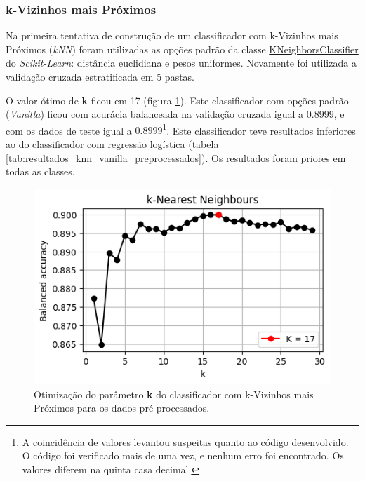 \documentclass[final,5p]{elsarticle}
\numberwithin{equation}{section}
\begin{document}
    \subsubsection{k-Vizinhos mais Próximos}

        Na primeira tentativa de construção de um classificador com k-Vizinhos mais Próximos (\emph{kNN}) foram utilizadas as opções padrão da classe \href{https://scikit-learn.org/stable/modules/generated/sklearn.neighbors.KNeighborsClassifier.html}{KNeighborsClassifier} do \emph{Scikit-Learn}: distância euclidiana e pesos uniformes. Novamente foi utilizada a validação cruzada estratificada em 5 pastas.

        O valor ótimo de \textbf{k} ficou em 17 (figura \ref{fig:knn_melhor_k_preprocessados}). Este classificador com opções padrão (\emph{Vanilla}) ficou com acurácia balanceada na validação cruzada igual a $0.8999$, e com os dados de teste igual a $0.8999$\footnote{A coincidência de valores levantou suspeitas quanto ao código desenvolvido. O código foi verificado mais de uma vez, e nenhum erro foi encontrado. Os valores diferem na quinta casa decimal.}. Este classificador teve resultados inferiores ao do classificador com regressão logística (tabela \ref{tab:resultados_knn_vanilla_preprocessados}). Os resultados foram priores em todas as classes.

        \begin{figure}[hbt!]
            \includegraphics[width=0.95\columnwidth]{A_kNN_bestK.png}
            \caption{Otimização do parâmetro \textbf{k} do classificador com k-Vizinhos mais Próximos para os dados pré-processados.}
            \label{fig:knn_melhor_k_preprocessados}
        \end{figure}
\end{document}
